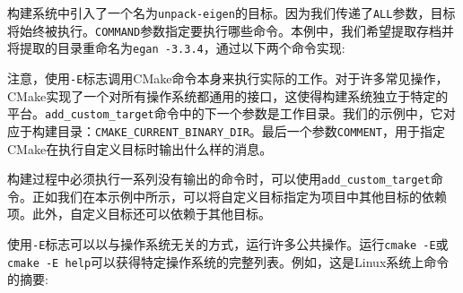 构建系统中引入了一个名为\texttt{unpack-eigen}的目标。因为我们传递了\texttt{ALL}参数，目标将始终被执行。\texttt{COMMAND}参数指定要执行哪些命令。本例中，我们希望提取存档并将提取的目录重命名为\texttt{egan -3.3.4}，通过以下两个命令实现:


注意，使用\texttt{-E}标志调用CMake命令本身来执行实际的工作。对于许多常见操作，CMake实现了一个对所有操作系统都通用的接口，这使得构建系统独立于特定的平台。\texttt{add\_custom\_target}命令中的下一个参数是工作目录。我们的示例中，它对应于构建目录：\texttt{CMAKE\_CURRENT\_BINARY\_DIR}。最后一个参数\texttt{COMMENT}，用于指定CMake在执行自定义目标时输出什么样的消息。


构建过程中必须执行一系列没有输出的命令时，可以使用\texttt{add\_custom\_target}命令。正如我们在本示例中所示，可以将自定义目标指定为项目中其他目标的依赖项。此外，自定义目标还可以依赖于其他目标。

使用\texttt{-E}标志可以以与操作系统无关的方式，运行许多公共操作。运行\texttt{cmake -E}或\texttt{cmake -E help}可以获得特定操作系统的完整列表。例如，这是Linux系统上命令的摘要:

